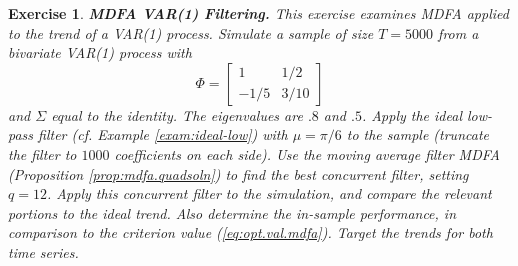 \documentclass[a4paper]{book}
\newtheorem{Exercise}{Exercise}
\begin{document}
\begin{Exercise} {\bf MDFA VAR(1) Filtering.} \rm
\label{exer:var1mdfa.filter}
 This exercise examines MDFA applied to the trend of a  VAR(1) process.
Simulate a sample of size $T=5000$ from a
 bivariate VAR(1) process with 
\[
  \Phi = \left[ \begin{array}{cc} 1 & 1/2 \\ -1/5 & 3/10 \end{array} \right]
\]
 and $\Sigma$ equal to the identity.  The eigenvalues are $.8$ and $.5$.
  Apply the   ideal low-pass filter (cf. Example \ref{exam:ideal-low}) with 
  $\mu = \pi/6$ to the sample (truncate the filter to $1000$ coefficients on each side).  
 Use the moving average filter
 MDFA  (Proposition \ref{prop:mdfa.quadsoln}) to find the best
 concurrent filter, setting $q= 12$. 
 Apply this concurrent filter 
 to the simulation, and compare the relevant portions to the ideal trend.
 Also determine the in-sample performance, in comparison to the criterion value
 (\ref{eq:opt.val.mdfa}).
  Target the trends for both time series.
\end{Exercise}
\end{document}
